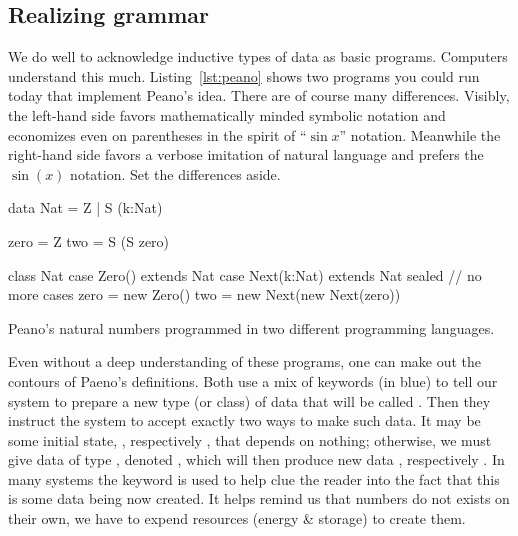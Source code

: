 \subsection{Realizing grammar}

We do well to acknowledge inductive types of data as basic programs. Computers
understand this much. Listing~\ref{lst:peano} shows two programs you could run
today that implement Peano's idea. There are of course many differences.
Visibly, the left-hand side favors mathematically minded symbolic notation and
economizes even on parentheses in the spirit of ``$\sin x$'' notation. Meanwhile
the right-hand side favors a verbose imitation of natural language and prefers
the $\sin(x)$ notation.  Set the differences aside.

\begin{lstfloat}
\begin{center}
\begin{minipage}{0.37\textwidth}
\begin{Fcode}[]
data Nat = Z 
    | S (k:Nat)

zero = Z
two = S (S zero)
\end{Fcode}
\end{minipage}
\hfill
\begin{minipage}{0.62\textwidth}
\begin{Pcode}[language=Sava]
class Nat
  case Zero() extends Nat
  case Next(k:Nat) extends Nat
sealed  // no more cases
zero = new Zero()
two = new Next(new Next(zero))
\end{Pcode}
\end{minipage}
\end{center}
\caption{Peano's natural numbers programmed in two different programming languages.}
\label{lst:peano}
\end{lstfloat}
    

Even without a deep understanding of these programs, one can make out the
contours of Paeno's definitions.  Both use a mix of keywords (in blue) to tell
our system to prepare a new type (or class) of data that will be called
.  Then they instruct the system to accept exactly two ways to make
such data. It may be some initial state, , respectively ,
that depends on nothing; otherwise, we must give data  of type
, denoted , which will then produce new data ,
respectively .  In many systems the keyword  is 
used to help clue the reader into the fact that this is some data being now 
created.  It helps remind us that numbers do not  exists on their own, 
we have to expend resources (energy \& storage) to create them. 



